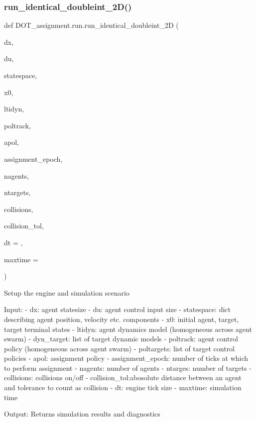 \subsubsection{\texorpdfstring{run\_identical\_doubleint\_2D()}{run\_identical\_doubleint\_2D()}}
{\footnotesize\ttfamily def D\+O\+T\+\_\+assignment.\+run.\+run\+\_\+identical\+\_\+doubleint\+\_\+2D (\begin{DoxyParamCaption}\item[{}]{dx,  }\item[{}]{du,  }\item[{}]{statespace,  }\item[{}]{x0,  }\item[{}]{ltidyn,  }\item[{}]{poltrack,  }\item[{}]{apol,  }\item[{}]{assignment\+\_\+epoch,  }\item[{}]{nagents,  }\item[{}]{ntargets,  }\item[{}]{collisions,  }\item[{}]{collision\+\_\+tol,  }\item[{}]{dt = {},  }\item[{}]{maxtime = {} }\end{DoxyParamCaption})}

\begin{DoxyVerb}Setup the engine and simulation scenario

Input:
    - dx:           agent statesize
    - du:           agent control input size
    - statespace:   dict describing agent position, velocity etc. components
    - x0:           initial agent, target, target terminal states
    - ltidyn:       agent dynamics model (homogeneous across agent swarm)
    - dyn_target:   list of target dynamic models
    - poltrack:     agent control policy (homogeneous across agent swarm)
    - poltargets:   list of target control policies
    - apol:         assignment policy
    - assignment_epoch: number of ticks at which to perform assignment
    - nagents:      number of agents
    - ntarges:      number of targets
    - collisions:   collisions on/off
    - collision_tol:abosolute distance between an agent and tolerance to count as collision
    - dt:           engine tick size
    - maxtime:      simulation time

Output: Returns simulation results and diagnostics\end{DoxyVerb}
 \mbox{\label{namespace_d_o_t__assignment_1_1run_abbf8223c20f4b28e56f84875d66b8a52}} 

